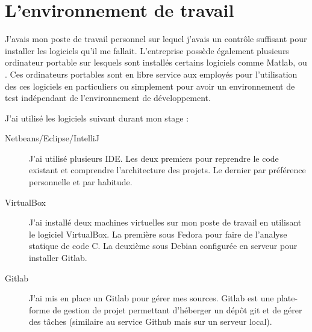 \section{L'environnement de travail}
J'avais mon poste de travail personnel sur lequel j'avais un contrôle suffisant pour installer les logiciels qu'il me fallait.
L'entreprise possède également plusieurs ordinateur portable sur lesquels sont installés certains logiciels comme Matlab\up{\circledR},  ou . Ces ordinateurs portables sont en libre service aux employés pour l'utilisation des ces logiciels en particuliers ou simplement pour avoir un environnement de test indépendant de l'environnement de développement.

J'ai utilisé les logiciels suivant durant mon stage :
\begin{description}
  \item[Netbeans/Eclipse/IntelliJ] J'ai utilisé plusieurs IDE. Les deux premiers pour reprendre le code existant et comprendre l'architecture des projets. Le dernier par préférence personnelle et par habitude.
  \item[VirtualBox] J'ai installé deux machines virtuelles sur mon poste de travail en utilisant le logiciel VirtualBox. La première sous Fedora pour faire de l'analyse statique de code C. La deuxième sous Debian configurée en serveur pour installer Gitlab.
  \item[Gitlab] J'ai mis en place un Gitlab pour gérer mes sources. Gitlab est une plate-forme de gestion de projet permettant d'héberger un dépôt git et de gérer des tâches (similaire au service Github mais sur un serveur local).
\end{description}

